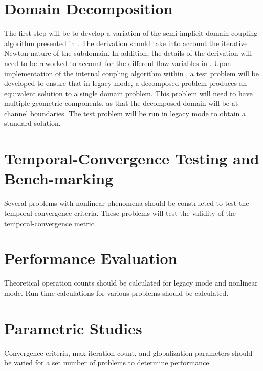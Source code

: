 \section{Domain Decomposition}
\label{sect:domain_coupling}
The first step will be to develop a variation of the semi-implicit domain coupling algorithm presented in .
The derivation should take into account the iterative Newton nature of the subdomain. 
In addition, the details of the derivation will need to be reworked to account for the different flow variables in \cobra.
Upon implementation of the internal coupling algorithm within \cobra, a test problem will be developed to ensure that in legacy mode, a decomposed problem produces an equivalent solution to a single domain problem.
This problem will need to have multiple geometric components, as that the decomposed domain will be at channel boundaries.
The test problem will be run in legacy mode to obtain a standard solution.

\section{Temporal-Convergence Testing and Bench-marking}
\label{sect:proposal_temporal_testing}
Several problems with nonlinear phenomena should be constructed to test the temporal convergence criteria.
These problems will test the validity of the temporal-convergence metric.

\section{Performance Evaluation}
\label{sect:proposal_performance_evaluation}
Theoretical operation counts should be calculated for legacy mode and nonlinear mode.
Run time calculations for various problems should be calculated.

\section{Parametric Studies}
\label{sect:proposal_parametric_studies}
Convergence criteria, max iteration count, and globalization parameters should be varied for a set number of problems to determine performance.

